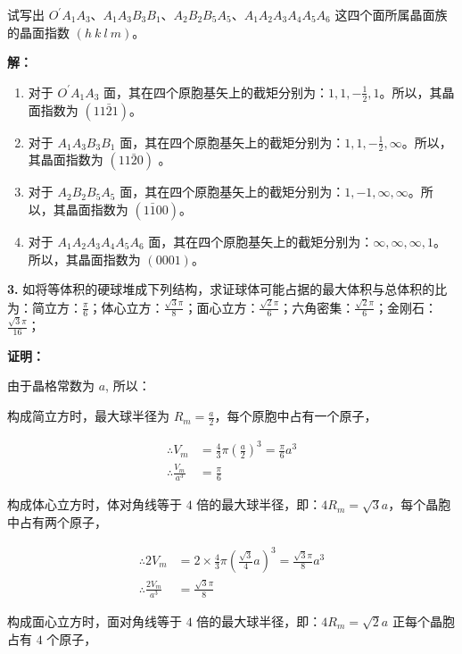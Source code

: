 \noindent 试写出 $O^\prime A_1 A_3$、$A_1 A_3 B_3 B_1$、$A_2 B_2 B_5 A_5$、$A_1 A_2 A_3 A_4 A_5 A_6$ 这四个面所属晶面族的晶面指数 $(h\ k\ l\ m)$。

\noindent \textbf{解：}

\begin{enumerate}
    \item 对于 $O^\prime A_1 A_3$ 面，其在四个原胞基矢上的截矩分别为：$1, 1, -\frac{1}{2}, 1$。所以，其晶面指数为 $(11\bar{2}1)$。
    \item 对于 $A_1 A_3 B_3 B_1$ 面，其在四个原胞基矢上的截矩分别为：$1, 1, -\frac{1}{2}, \infty$。所以，其晶面指数为 $(11\bar{2}0)$ 。
    \item 对于 $A_2 B_2 B_5 A_5$ 面，其在四个原胞基矢上的截矩分别为：$1, -1, \infty, \infty$。所以，其晶面指数为 $(1\bar{1}00)$。
    \item 对于 $A_1 A_2 A_3 A_4 A_5 A_6$ 面，其在四个原胞基矢上的截矩分别为：$\infty, \infty, \infty, 1$。所以，其晶面指数为 $(0001)$。
\end{enumerate}

\noindent \textbf{3.\quad} 如将等体积的硬球堆成下列结构，求证球体可能占据的最大体积与总体积的比为：简立方：$\frac{\pi}{6}$；体心立方：$\frac{\sqrt{3}\pi}{8}$；面心立方：$\frac{\sqrt{2}\pi}{6}$；六角密集：$\frac{\sqrt{2}\pi}{6}$；金刚石：$\frac{\sqrt{3}\pi}{16}$；

\noindent \textbf{证明：}

由于晶格常数为 $a$, 所以：

构成简立方时，最大球半径为 $R_m=\frac{a}{2}$，每个原胞中占有一个原子，

\begin{align*}
    \therefore V_m &= \frac{4}{3} \pi \left(\frac{a}{2}\right)^3 = \frac{\pi}{6} a^3 \\
    \therefore \frac{V_m}{a^3} &= \frac{\pi}{6}
\end{align*}

构成体心立方时，体对角线等于 $4$ 倍的最大球半径，即：$4 R_m=\sqrt{3} a$，每个晶胞中占有两个原子，

\begin{align*}
    \therefore 2 V_m &= 2 \times \frac{4}{3} \pi \left(\frac{\sqrt{3}}{4} a\right)^3 = \frac{\sqrt{3}\pi}{8} a^3 \\
    \therefore \frac{2 V_m}{a^3} &= \frac{\sqrt{3}\pi}{8}
\end{align*}

构成面心立方时，面对角线等于 $4$ 倍的最大球半径，即：$4 R_m=\sqrt{2}a$ 正每个晶胞占有 $4$ 个原子，

